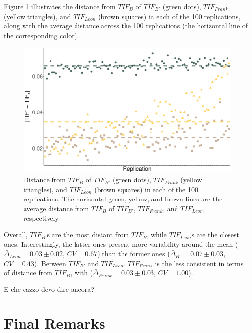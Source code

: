 \documentclass{svproc}
\begin{document}
Figure \ref{fig:points-alogirthms} illustrates the distance from $TIF_B$ of  $TIF_{B'}$ (green dots), $TIF_{Frank}$ (yellow triangles), and $TIF_{Leon}$ (brown squares) in each of the 100 replications, along with the average distance across the 100 replications (the horizontal line of the corresponding color).

\begin{figure}[!h]
	\centering
	\includegraphics[width=\linewidth]{img/points-alogirthms}
	\caption{Distance from $TIF_{B}$ of $TIF_{B'}$ (green dots), $TIF_{Frank}$ (yellow triangles), and $TIF_{Leon}$ (brown squares) in each of the 100 replications. The horizontal green, yellow, and brown lines are the average distance from $TIF_B$ of $TIF_{B'}$, $TIF_{Frank}$, and $TIF_{Leon}$, respectively}
	\label{fig:points-alogirthms}
\end{figure}

Overall, $TIF_{B'}$s are the most distant from $TIF_B$, while $TIF_{Leon}$s are the closest ones. Interestingly, the latter ones present more variability around the mean ($\bar{\Delta}_{Leon} = 0.03	\pm	0.02$, $CV =0.67$) than the former ones ($\bar{\Delta}_{B'} = 0.07	\pm	0.03$, $CV =0.43$). Between $TIF_{B'}$ and $TIF_{Leon}$, $TIF_{Frank}$ is the less consistent in terms of distance from $TIF_{B}$, with ($\bar{\Delta}_{Frank} = 0.03	\pm	0.03$, $CV = 1.00$). 

E che cazzo devo dire ancora? 

\section{Final Remarks}
\end{document}
